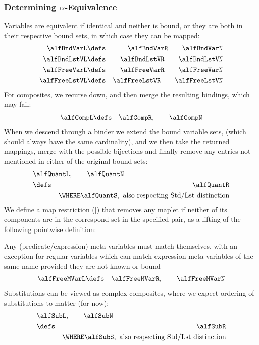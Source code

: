 \subsubsection{Determining $\alpha$-Equivalence}

Variables are equivalent if identical and neither is bound,
or they are both in their respective bound sets,
in which case they can be mapped:
\begin{eqnarray*}
   \alfBndVarL  &\defs& \alfBndVarR  \qquad \alfBndVarN
\\ \alfBndLstVL  &\defs& \alfBndLstVR  \qquad \alfBndLstVN
\\ \alfFreeVarL &\defs& \alfFreeVarR \qquad \alfFreeVarN
\\ \alfFreeLstVL &\defs& \alfFreeLstVR \qquad \alfFreeLstVN
\end{eqnarray*}
For composites, we recurse down,
and then merge the resulting bindings,
which may fail:
\begin{eqnarray*}
   \alfCompL &\defs& \alfCompR, \qquad \alfCompN
\end{eqnarray*}
When we descend through a binder
we extend the bound variable sets,
(which should always have the same cardinality),
and we then take the returned mappings,
merge with the possible bijections
and finally remove any entries not mentioned in either of the original bound sets:
\begin{eqnarray*}
   \lefteqn{\alfQuantL, \qquad \alfQuantN}
\\ &\defs& \alfQuantR
\\ && \WHERE
        \alfQuantS, \mbox{ also respecting Std/Lst distinction}
\end{eqnarray*}
We define a map restriction  ($|$) that removes any maplet
if neither of its components are in the correspond set in the specified pair,
as a lifting of the following pointwise definition:

\ALFMAPRESTRICT

Any (predicate/expression) meta-variables must match themselves,
with an exception for regular variables
which can match expression meta variables of the same name
provided they are not known or bound
\begin{eqnarray*}
   \alfFreeMVarL &\defs& \alfFreeMVarR, \qquad \alfFreeMVarN
\end{eqnarray*}
Substitutions can be viewed as complex composites,
where we expect ordering of substitutions to matter (for now):
\begin{eqnarray*}
   \lefteqn{\alfSubL, \qquad \alfSubN}
\\ &\defs&
   \alfSubR
\\ && \WHERE
        \alfSubS, \mbox{ also respecting Std/Lst distinction}
\end{eqnarray*}

